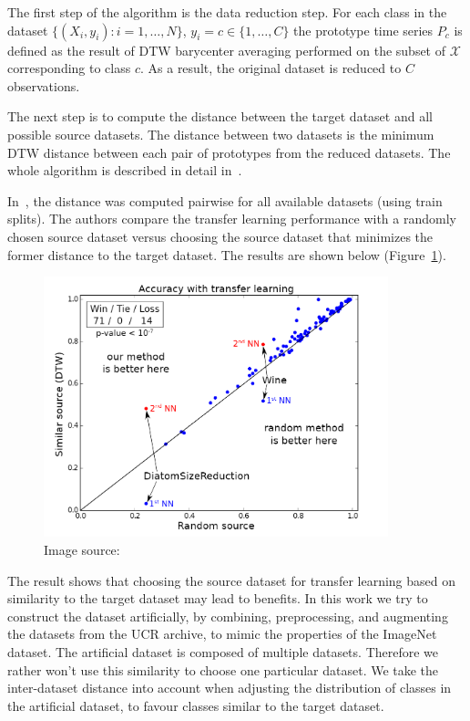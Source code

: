 \documentclass[a4paper,11pt,twoside]{report}
\theoremstyle{definition}
\begin{document}
The first step of the algorithm is the data reduction step. For each class in the dataset $\{(X_i, y_i): i=1, \dots , N\}$, $y_i=c \in \{ 1, \dots, C\}$ the prototype time series $P_c$ is defined as the result of DTW barycenter averaging performed on the subset of $\mathcal{X}$ corresponding to class $c$. As a result, the original dataset is reduced to $C$ observations.


The next step is to compute the distance between the target dataset and all possible source datasets. The distance between two datasets is the minimum DTW distance between each pair of prototypes from the reduced datasets. The whole algorithm is described in detail in~\cite{transfer_learning_time_series}.

In~\cite{transfer_learning_time_series}, the distance was computed pairwise for all available datasets (using train splits). The authors compare the transfer learning performance with a randomly chosen source dataset versus choosing the source dataset that minimizes the former distance to the target dataset. The results are shown below (Figure~\ref{fig:smart_transfer_learning}).
\FloatBarrier


\begin{figure}[h!]
\centering
\includegraphics[width=10cm]{imgs/smart_transfer_learning.png}
\caption{Image source:~\cite{transfer_learning_time_series}}
\label{fig:smart_transfer_learning}
\end{figure}
\FloatBarrier

The result shows that choosing the source dataset for transfer learning based on similarity to the target dataset may lead to benefits. In this work we try to construct the dataset artificially, by combining, preprocessing, and augmenting the datasets from the UCR archive, to mimic the properties of the ImageNet dataset. The artificial dataset is composed of multiple datasets. Therefore we rather won't use this similarity to choose one particular dataset. We take the inter-dataset distance into account when adjusting the distribution of classes in the artificial dataset, to favour classes similar to the target dataset.
\end{document}

